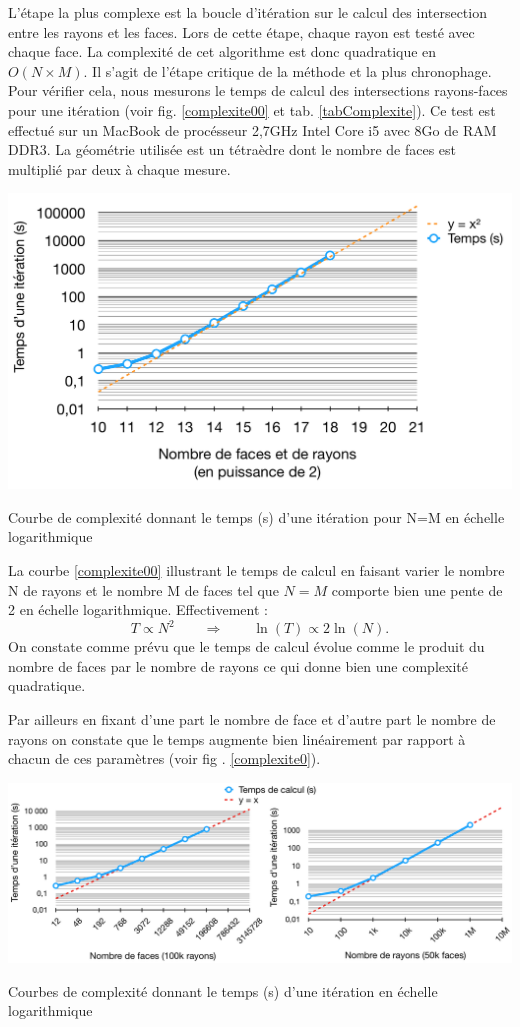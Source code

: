 L'étape la plus complexe est la boucle d'itération sur le calcul des intersection entre les rayons et les faces. Lors de cette étape, chaque rayon est testé avec chaque face. La complexité de cet algorithme est donc quadratique en $O(N \times M)$. Il s'agit de l'étape critique de la méthode et la plus chronophage. Pour vérifier cela, nous mesurons le temps de calcul des intersections rayons-faces pour une itération (voir fig. \ref{complexite00} et tab. \ref{tabComplexite}). Ce test est effectué sur un MacBook de procésseur 2,7GHz Intel Core i5 avec 8Go de RAM DDR3. La géométrie utilisée est un tétraèdre dont le nombre de faces est multiplié par deux à chaque mesure.


 \begin{figureth}
	\includegraphics[width=0.8\linewidth]{images/complexite00}
	\caption{Courbe de complexité donnant le temps (s) d'une itération pour N=M en échelle logarithmique}
	\label{complexite00}
\end{figureth}

La courbe \ref{complexite00} illustrant le temps de calcul en faisant varier le nombre N de rayons et le nombre M de faces tel que $N=M$ comporte bien une pente de 2 en échelle logarithmique. Effectivement :
%
\begin{equation}
T \propto N^2 \qquad \Rightarrow \qquad \ln{(T)} \propto 2 \ln{(N)}.
\end{equation}
On constate comme prévu que le temps de calcul évolue comme le produit du nombre de faces par le nombre de rayons ce qui donne bien une complexité quadratique. 

Par ailleurs en fixant d'une part le nombre de face et d'autre part le nombre de rayons on constate que le temps augmente bien linéairement par rapport à chacun de ces paramètres (voir fig . \ref{complexite0}).

 \begin{figureth}
	\includegraphics[width=\linewidth]{images/complexite0}
	\caption{Courbes de complexité donnant le temps (s) d'une itération en échelle logarithmique}
	\label{complexite0}
\end{figureth}


